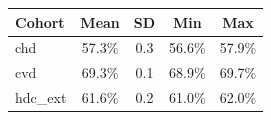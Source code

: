 \begin{tabular}{lcccc}
\toprule
Cohort & Mean & SD & Min & Max \\
\midrule
chd & 57.3\% & 0.3 & 56.6\% & 57.9\% \\
cvd & 69.3\% & 0.1 & 68.9\% & 69.7\% \\
hdc_ext & 61.6\% & 0.2 & 61.0\% & 62.0\% \\
\bottomrule
\end{tabular}
